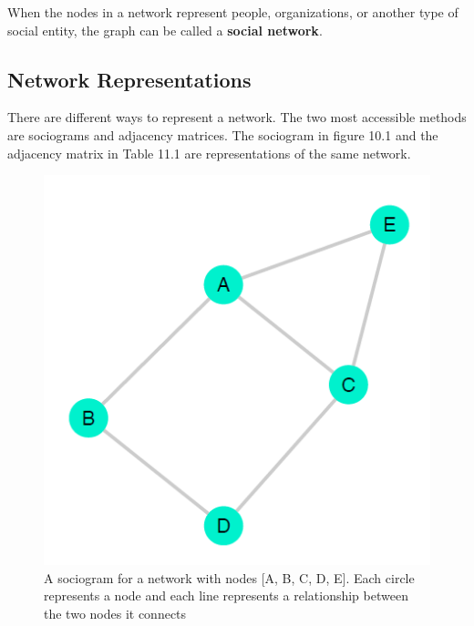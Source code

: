 \documentclass{book}
\begin{document}
When the nodes in a network represent people, organizations, or another type
of social entity, the graph can be called a \textbf{social network}.

\hypertarget{network-representations}{%
\subsection{Network Representations}\label{network-representations}}

There are different ways to represent a network. The two most accessible
methods are sociograms and adjacency matrices. The sociogram in figure 10.1
and the adjacency matrix in Table 11.1 are representations of the same
network.

\begin{figure}
\centering
\includegraphics{images/social-networks/11-1.png}
\caption{A sociogram for a network with nodes {[}A, B, C, D, E{]}. Each circle
represents a node and each line represents a relationship between the two
nodes it connects}
\end{figure}
\end{document}
